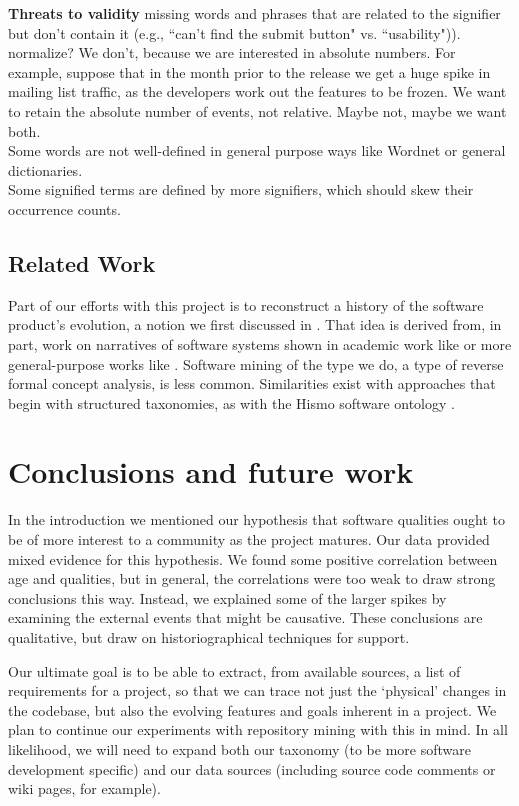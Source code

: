 \documentclass[conference, compsoc]{IEEEtran}
\begin{document}
\noindent\textbf{Threats to validity}
missing words and phrases that are related to the signifier but don't contain it (e.g., ``can't find the submit button" vs. ``usability")). \\
normalize? We don't, because we are interested in absolute numbers. For example, suppose that in the month prior to the release we get a huge spike in mailing list traffic, as the developers work out the features to be frozen. We want to retain the absolute number of events, not relative. Maybe not, maybe we want both.\\
Some words are not well-defined in general purpose ways like Wordnet or general dictionaries.\\
Some signified terms are defined by more signifiers, which should skew their occurrence counts.\\
\subsection{Related Work}
Part of our efforts with this project is to reconstruct a history of the software product's evolution, a notion we first discussed in \cite{Ernst07icsm}. That idea is derived from, in part, work on narratives of software systems shown in academic work like \cite{Anton2001} or more general-purpose works like \cite{waldo93}. Software mining of the type we do, a type of reverse formal concept analysis, is less common. Similarities exist with approaches that begin with structured taxonomies, as with the Hismo software ontology \cite{Girba2006}.

\vspace{-2mm}
\section{Conclusions and future work}
\vspace{-2mm}
In the introduction we mentioned our hypothesis that software qualities ought to be of more interest to a community as the project matures. Our data provided mixed evidence for this hypothesis. We found some positive correlation between age and qualities, but in general, the correlations were too weak to draw strong conclusions this way. Instead, we explained some of the larger spikes by examining the external events that might be causative. These conclusions are qualitative, but draw on historiographical techniques for support.

Our ultimate goal is to be able to extract, from available sources, a list of requirements for a project, so that we can trace not just the `physical' changes in the codebase, but also the evolving features and goals inherent in a project. We plan to continue our experiments with repository mining with this in mind. In all likelihood, we will need to expand both our taxonomy (to be more software development specific) and our data sources (including source code comments or wiki pages, for example).
\end{document}
